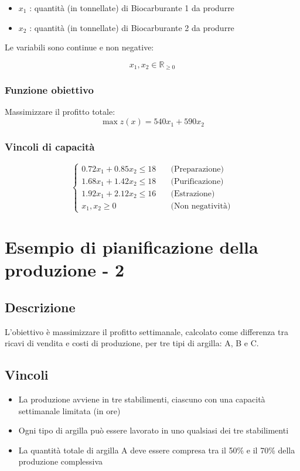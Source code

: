 \begin{itemize}
    \item $x_1$ : quantità (in tonnellate) di Biocarburante 1 da produrre
    \item $x_2$ : quantità (in tonnellate) di Biocarburante 2 da produrre
\end{itemize}

Le variabili sono continue e non negative:

\[
x_1, x_2 \in \mathbb{R}_{\geq 0}
\]

\subsubsection{Funzione obiettivo}

Massimizzare il profitto totale:
\[
\max z(x) = 540x_1 + 590x_2
\]

\subsubsection{Vincoli di capacità}
\[
\begin{cases}
0.72x_1 + 0.85x_2 \leq 18 \quad &\text{(Preparazione)} \\
1.68x_1 + 1.42x_2 \leq 18 \quad &\text{(Purificazione)} \\
1.92x_1 + 2.12x_2 \leq 16 \quad &\text{(Estrazione)} \\
x_1, x_2 \geq 0 \quad &\text{(Non negatività)}
\end{cases}
\]

\section{Esempio di pianificazione della produzione - 2}
\subsection{Descrizione}
L'obiettivo è massimizzare il profitto settimanale, calcolato come differenza tra ricavi di vendita e costi di produzione, per tre tipi di argilla: A, B e C.

\subsection{Vincoli}
\begin{itemize}
    \item La produzione avviene in tre stabilimenti, ciascuno con una capacità settimanale limitata (in ore)
    \item Ogni tipo di argilla può essere lavorato in uno qualsiasi dei tre stabilimenti
    \item La quantità totale di argilla A deve essere compresa tra il 50\% e il 70\% della produzione complessiva
\end{itemize}

